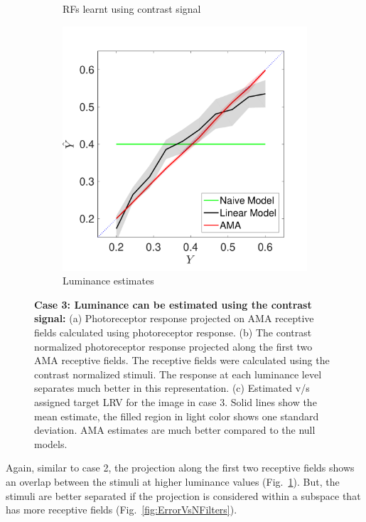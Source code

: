 \documentclass{jov}
\begin{document}
\begin{figure}
\begin{subfigure}[b]{0.3 \textwidth}
        \caption{RFs learnt using contrast signal}
        \label{fig:constrastWorks}
    \end{subfigure}
            \begin{subfigure}[b]{0.3 \textwidth}
        \includegraphics[width=\textwidth]{../Figures/Figure12/Figure12_c.pdf}
        \caption{Luminance estimates}
        \label{fig:case10Results}
    \end{subfigure}
    \caption{{\bf Case 3: Luminance can be estimated using the contrast signal:} (a) Photoreceptor response projected on AMA receptive fields calculated using photoreceptor response. (b) The contrast normalized photoreceptor response projected along the first two AMA receptive fields. The receptive fields were calculated using the contrast normalized stimuli. The response at each luminance level separates much better in this representation. (c) Estimated v/s assigned target LRV for the image in case 3. Solid lines show the mean estimate, the filled region in light color  shows one standard deviation. AMA estimates are much better compared to the null models.}
\label{fig:importanceOfConstrast}
\end{figure}

Again, similar to case 2, the projection along the first two receptive fields shows an overlap between the stimuli at higher luminance values (Fig.~\ref{fig:constrastWorks}). But, the stimuli are better separated if the projection is considered within a subspace that has more receptive fields (Fig.~\ref{fig:ErrorVsNFilters}).
\end{document}
